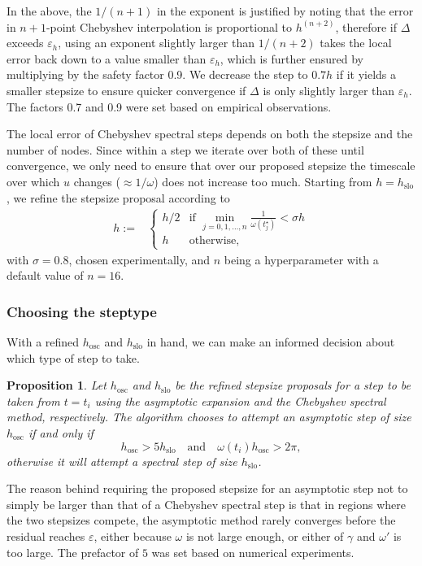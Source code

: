 \documentclass[10pt]{article}
\newtheorem{pro}[thm]{Proposition}
\newcommand{\om}{\omega}
\newcommand{\g}{\gamma}
\begin{document}
In the above, the $1/(n+1)$ in the exponent is justified by noting that the
error in $n+1$-point Chebyshev interpolation is proportional to $h^(n+2)$, therefore if
$\Delta$ exceeds $\varepsilon_h$, using an exponent slightly larger than $1/(n+2)$ takes
the local error back down to a value smaller than $\varepsilon_h$, which is further
ensured by multiplying by the safety factor 0.9. We decrease the step to $0.7h$
if it yields a smaller stepsize to ensure quicker convergence if $\Delta$ is
only slightly larger than $\varepsilon_h$. The factors 0.7 and 0.9 were set based on
empirical observations. 

The local error of Chebyshev spectral steps depends on both the stepsize and
the number of nodes. Since within a step we iterate over both of these until
convergence, we only need to ensure that over our proposed stepsize the
timescale over which $u$ changes ($\approx 1/\om$) does not increase too much. Starting from $h =
h_{\text{slo}}$, we refine the stepsize proposal according to
\begin{align}
    h :=& \begin{cases}
        h/2 &\text{if } \min\limits_{j = 0, 1, \ldots, n}\frac{1}{\om(t^{\star}_j)} < \sigma h \\
        h &\text{otherwise},
    \end{cases}
\end{align}
with $\sigma = 0.8$, chosen experimentally, and $n$ being a hyperparameter with a default value of $n = 16$.

\subsubsection{Choosing the steptype}

With a refined $h_{\text{osc}}$ and $h_{\text{slo}}$ in hand, we can make an informed decision about which type of step to take.
\begin{pro}\label{steptypechoose}
    Let $h_{\text{osc}}$ and $h_{\text{slo}}$ be the refined stepsize proposals
    for a step to be taken from $t = t_i$ using the asymptotic expansion and the Chebyshev
    spectral method, respectively. The algorithm chooses to attempt an
    asymptotic step of size $h_{\text{osc}}$ if and only if
$$ h_{\text{osc}} > 5h_{\text{slo}} \quad \text{and} \quad \omega(t_i) h_{\text{osc}} > 2\pi, $$
    otherwise it will attempt a spectral step of size $h_{\text{slo}}$.
\end{pro}
The reason behind requiring the proposed stepsize for an asymptotic step not to
simply be larger than that of a Chebyshev spectral step is that in regions
where the two stepsizes compete, the asymptotic method rarely converges before
the residual reaches $\varepsilon$, either because $\om$ is not large enough, or
either of $\g$ and $\om'$ is too large. The prefactor of $5$ was set based on numerical experiments. 
\end{document}
